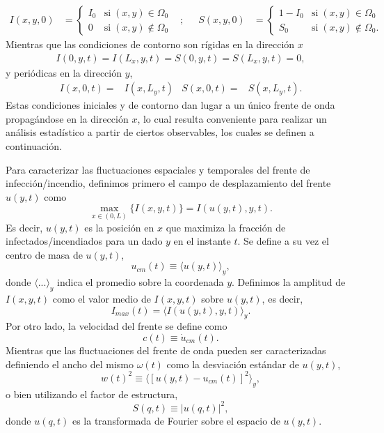 \begin{align*}
  I(x,y,0) &= 
  \begin{cases}
  I_0 & \text{si} \; (x,y) \in \Omega_0 \\
  0 & \text{si} \; (x,y) \notin \Omega_0  
  \end{cases}
  & ;&&
  S(x,y,0) &=
  \begin{cases}
  1-I_0 & \text{si} \; (x,y) \in \Omega_0 \\
  S_0 & \text{si} \; (x,y) \notin \Omega_0.
  \end{cases}
\end{align*}
Mientras que las condiciones de contorno son rígidas en la dirección $x$
\begin{align*}
  I(0,y,t)=I(L_x,y,t)=S(0,y,t)=S(L_x,y,t)=0,
\end{align*}
y periódicas en la dirección $y$, 
\begin{align*}
  I(x,0,t)=&I(x,L_y,t) & S(x,0,t)=&S(x,L_y,t). 
\end{align*}
Estas condiciones iniciales y de contorno dan lugar a un único frente de onda propagándose en la dirección $x$, lo cual resulta conveniente para realizar un análisis 
estadístico a partir de ciertos observables, los cuales se definen a continuación.

Para caracterizar las fluctuaciones espaciales y temporales del frente de infección/incendio, definimos primero el campo de desplazamiento del frente $u(y,t)$ como
\begin{equation}
  \max_{x\in(0,L)}\{I(x,y,t)\}=I(u(y,t),y,t).\label{campo}
\end{equation}
Es decir, $u(y,t)$ es la posición en $x$ que maximiza la fracción de infectados/incendiados para un dado $y$ en el instante $t$. Se define a su vez el centro de masa
de $u(y,t)$,
\begin{equation}
  u_{cm}(t)\equiv\langle u(y,t)\rangle_{y},\label{centromasa}
\end{equation}
donde $\langle...\rangle_{y}$ indica el promedio sobre la coordenada $y$. Definimos la amplitud de $I(x,y,t)$ como el valor medio de $I(x,y,t)$ sobre $u(y,t)$, es decir,
\begin{equation}
  I_{max}(t)=\langle I(u(y,t),y,t)\rangle_{y}.\label{maximo}
\end{equation}
Por otro lado, la velocidad del frente se define como
\begin{equation}
  c(t)\equiv\dot{u}_{cm}(t).\label{velocidad}
\end{equation}
Mientras que las fluctuaciones del frente de onda pueden ser caracterizadas definiendo el ancho del mismo $\omega(t)$ como la desviación estándar de $u(y,t)$,
\begin{equation}
  w(t)^2\equiv\langle[u(y,t)-u_{cm}(t)]^2\rangle_{y},\label{rugosidad}
\end{equation}  
o bien utilizando el factor de estructura,
\begin{equation}
  S(q,t)\equiv|u(q,t)|^2,\label{factor}
\end{equation}
donde $u(q,t)$ es la transformada de Fourier sobre el espacio de $u(y,t)$.

